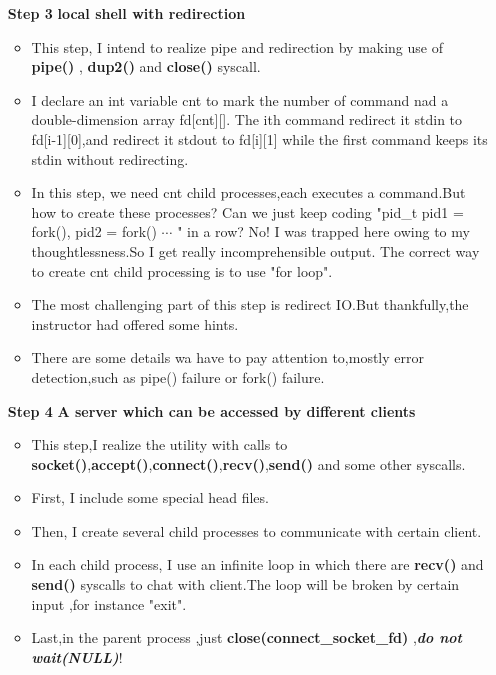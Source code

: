 \documentclass[]{article}
\begin{document}
\begin{enumerate}
            \item[\textbf{Step 3}]  \textbf{local shell with redirection}
            \begin{itemize}
                \item This step, I intend to realize pipe and redirection by making use of \textbf{pipe()} , \textbf{dup2()} and \textbf{close()} syscall.
                \item I declare an int variable cnt to mark the number of command nad a double-dimension array fd[cnt][]. The ith command redirect it stdin to fd[i-1][0],and redirect it stdout to fd[i][1] while the first command keeps its stdin without redirecting.
                \item In this step, we need cnt child processes,each executes a command.But how to create these processes? Can we just keep coding "pid\_t pid1 = fork(), pid2 = fork() $\cdots$ " in a row? No! I was trapped here owing to my thoughtlessness.So I get really incomprehensible output.
                The correct way to create cnt child processing is to use "for loop".
                \item The most challenging part of this step is redirect IO.But thankfully,the instructor had offered some hints.
                \item There are some details wa have to pay attention to,mostly error detection,such as pipe() failure or fork() failure.
                
            \end{itemize}

            \item[\textbf{Step 4}] \textbf{A server which can be accessed by different clients}
            \begin{itemize}
                \item This step,I realize the utility with calls to \textbf{socket()},\textbf{accept()},\textbf{connect()},\textbf{recv()},\textbf{send()} and some other syscalls.
                \item First, I include some special head files.
                \item Then, I create several child processes to communicate with certain client.
                \item In each child process, I use an infinite loop in which there are \textbf{recv()} and \textbf{send()} syscalls to chat with client.The loop will be broken by certain input ,for instance "exit".
                \item Last,in the parent process ,just \textbf{close(connect\_socket\_fd)} ,\textbf{\emph{do not wait(NULL)}}!
            \end{itemize}


\end{enumerate}
\end{document}
